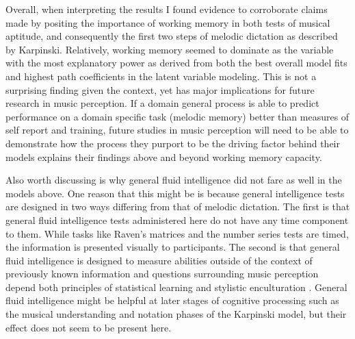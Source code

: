 \documentclass[]{book}
\begin{document}
Overall, when interpreting the results I found evidence to corroborate claims made by \citet{berzWorkingMemoryMusic1995} positing the importance of working memory in both tests of musical aptitude, and consequently the first two steps of melodic dictation as described by Karpinski.
Relatively, working memory seemed to dominate as the variable with the most explanatory power as derived from both the best overall model fits and highest path coefficients in the latent variable modeling.
This is not a surprising finding given the context, yet has major implications for future research in music perception.
If a domain general process is able to predict performance on a domain specific task (melodic memory) better than measures of self report and training, future studies in music perception will need to be able to demonstrate how the process they purport to be the driving factor behind their models explains their findings above and beyond working memory capacity.

Also worth discussing is why general fluid intelligence did not fare as well in the models above.
One reason that this might be is because general intelligence tests are designed in two ways differing from that of melodic dictation.
The first is that general fluid intelligence tests administered here do not have any time component to them.
While tasks like Raven's matrices \citep{ravenManualRavenProgressive1994} and the number series \citep{thurstonePrimaryMentalAbilities1938} tests are timed, the information is presented visually to participants.
The second is that general fluid intelligence is designed to measure abilities outside of the context of previously known information \citep{cattellAbilitiesTheirGrowth1971} and questions surrounding music perception depend both principles of statistical learning \citep{huronSweetAnticipation2006, pearceStatisticalLearningProbabilistic2018a, saffranStatisticalLearningTone1999} and stylistic enculturation \citep{demorestLostTranslationEnculturation2008, eerolaExpectancySamiYoiks2009, meyerEmotionMeaningMusic1956}.
General fluid intelligence might be helpful at later stages of cognitive processing such as the musical understanding and notation phases of the Karpinski model, but their effect does not seem to be present here.
\end{document}
